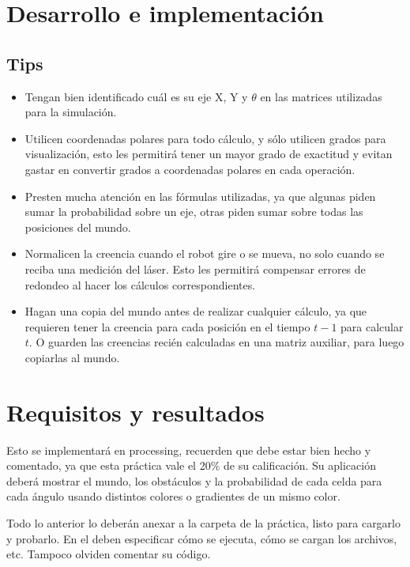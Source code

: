\parencite{Dieter1999}


\section{Desarrollo e implementaci\'on}

\subsection{Tips}

\begin{itemize}
  \item Tengan bien identificado cuál es su eje X, Y y \(\theta\) en las matrices utilizadas para la simulación.
  \item Utilicen coordenadas polares para todo cálculo, y sólo utilicen grados para visualización, esto les permitirá tener un mayor grado de exactitud y evitan gastar en convertir grados a coordenadas polares en cada operación.
  \item Presten mucha atención en las fórmulas utilizadas, ya que algunas piden sumar la probabilidad sobre un eje, otras piden sumar sobre todas las posiciones del mundo.
  \item Normalicen la creencia cuando el robot gire o se mueva, no solo cuando se reciba una medición del láser. Esto les permitirá compensar errores de redondeo al hacer los cálculos correspondientes.
  \item Hagan una copia del mundo antes de realizar cualquier cálculo, ya que requieren tener la creencia para cada posición en el tiempo \(t-1\) para calcular \(t\). O guarden las creencias recién calculadas en una matriz auxiliar, para luego copiarlas al mundo.
\end{itemize}


\section{Requisitos y resultados}

Esto se implementará en processing, recuerden que debe estar bien hecho y comentado, ya que esta práctica vale el 20\% de su calificación. Su aplicación deberá mostrar el mundo, los obstáculos y la probabilidad de cada celda para cada ángulo usando distintos colores o gradientes de un mismo color.

Todo lo anterior lo deberán anexar a la carpeta de la práctica, listo para cargarlo y probarlo. En el  deben especificar cómo se ejecuta, cómo se cargan los archivos, etc. Tampoco olviden comentar su código.
